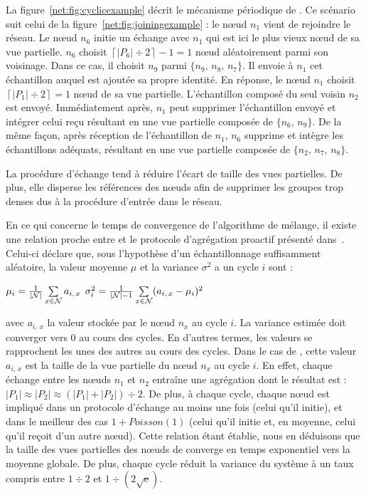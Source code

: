 La figure~\ref{net:fig:cyclicexample} décrit le mécanisme périodique de
\SPRAY. Ce scénario suit celui de la figure~\ref{net:fig:joiningexample} : le
nœud $n_1$ vient de rejoindre le réseau. Le nœud $n_6$ initie un échange avec
$n_1$ qui est ici le plus vieux nœud de sa vue partielle. $n_6$ choisit
$\left\lceil{|P_6|\div 2}\right\rceil -1 = 1$ nœud aléatoirement parmi son
voisinage. Dans ce cas, il choisit $n_9$ parmi $\{n_9,\,n_8,\,n_7\}$. Il envoie
à $n_1$ cet échantillon auquel est ajoutée sa propre identité. En réponse, le
nœud $n_1$ choisit $\left\lceil{|P_1|\div 2}\right\rceil = 1$ nœud de sa vue
partielle. L'échantillon composé du seul voisin $n_2$ est envoyé. Immédiatement
après, $n_1$ peut supprimer l'échantillon envoyé et intégrer celui reçu
résultant en une vue partielle composée de $\{n_6,\, n_9\}$.  De la même façon,
après réception de l'échantillon de $n_1$, $n_6$ supprime et intègre les
échantillons adéquats, résultant en une vue partielle composée de
$\{n_2,\,n_7,\,n_8\}$.

La procédure d'échange tend à réduire l'écart de taille des vues partielles. De
plus, elle disperse les références des nœuds afin de supprimer les groupes trop
denses dus à la procédure d'entrée dans le réseau.

En ce qui concerne le temps de convergence de l'algorithme de mélange, il existe
une relation proche entre \SPRAY et le protocole d'agrégation proactif
présenté dans~\cite{jelasity2004epidemic, montresor2004robust}. Celui-ci déclare
que, sous l'hypothèse d'un échantillonnage suffisamment aléatoire, la valeur
moyenne $\mu$ et la variance $\sigma^2$ a un cycle $i$ sont :
\begin{center}
  $\mu_i = {1\over{|\mathcal{N}|}} \sum\limits_{x \in \mathcal{N}} a_{i,\,x}$
  \hfill
  $\sigma^2_i = {1\over{|\mathcal{N}|-1}}\sum\limits_{x \in \mathcal{N}}
  (a_{i,\,x} - \mu_i)^2$
\end{center}
avec $a_{i,\,x}$ la valeur stockée par le nœud $n_x$ au cycle $i$. La variance
estimée doit converger vers 0 au cours des cycles. En d'autres termes, les
valeurs se rapprochent les unes des autres au cours des cycles. Dans le cas de
\SPRAY, cette valeur $a_{i,\,x}$ est la taille de la vue partielle du nœud $n_x$
au cycle $i$. En effet, chaque échange entre les nœuds $n_1$ et $n_2$ entraîne
une agrégation dont le résultat est :
$|P_1|\approx|P_2|\approx{(|P_1| + |P_2|) \div 2}$.  De plus, à chaque cycle,
chaque nœud est impliqué dans un protocole d'échange au moins une fois (celui
qu'il initie), et dans le meilleur des cas $1+Poisson(1)$ (celui qu'il initie
et, en moyenne, celui qu'il reçoit d'un autre nœud). Cette relation étant
établie, nous en déduisons que la taille des vues partielles des nœuds de \SPRAY
converge en temps exponentiel vers la moyenne globale. De plus, chaque cycle
réduit la variance du système à un taux compris entre ${1\div 2}$ et
$1\div ({2\sqrt{\text{e}}})$.

